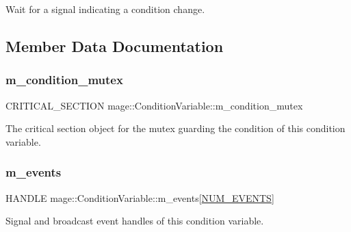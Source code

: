 Wait for a signal indicating a condition change. 

\subsection{Member Data Documentation}
\hypertarget{classmage_1_1_condition_variable_ab5ff870b2881a1979ccaec986d762441}{}\label{classmage_1_1_condition_variable_ab5ff870b2881a1979ccaec986d762441} 
\subsubsection{\texorpdfstring{m\+\_\+condition\+\_\+mutex}{m\_condition\_mutex}}
{\footnotesize\ttfamily C\+R\+I\+T\+I\+C\+A\+L\+\_\+\+S\+E\+C\+T\+I\+ON mage\+::\+Condition\+Variable\+::m\+\_\+condition\+\_\+mutex\hspace{0.3cm}{\ttfamily [private]}}

The critical section object for the mutex guarding the condition of this condition variable. \hypertarget{classmage_1_1_condition_variable_aa3eeb3cf7cdcc70e651ee67800b713f5}{}\label{classmage_1_1_condition_variable_aa3eeb3cf7cdcc70e651ee67800b713f5} 
\subsubsection{\texorpdfstring{m\+\_\+events}{m\_events}}
{\footnotesize\ttfamily H\+A\+N\+D\+LE mage\+::\+Condition\+Variable\+::m\+\_\+events\mbox{[}\hyperlink{classmage_1_1_condition_variable_a600fb5094237230f6b260b31d6fb0945a2c43161b9ddfb393865606bfb3a51fac}{N\+U\+M\+\_\+\+E\+V\+E\+N\+TS}\mbox{]}\hspace{0.3cm}{\ttfamily [private]}}

Signal and broadcast event handles of this condition variable. \hypertarget{classmage_1_1_condition_variable_ac02cb14000a597ec91b8546bdcbb9dd1}{}\label{classmage_1_1_condition_variable_ac02cb14000a597ec91b8546bdcbb9dd1} 
